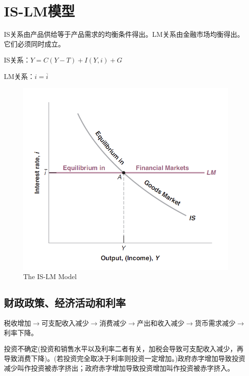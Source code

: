 \documentclass{article}
\begin{document}
\section{IS-LM模型}

IS关系由产品供给等于产品需求的均衡条件得出。LM关系由金融市场均衡得出。它们必须同时成立。

IS关系：$ Y=C(Y-T)+I(Y,i)+G $

LM关系：$ i=\overline{i} $

\begin{figure}[H] %
	\centering %
	\includegraphics[width=1\textwidth]{5_4} %
	\caption{The IS-LM Model} %
	\label{Fig.main5} %
\end{figure}







\iffalse
\subsection{财政政策、经济活动和利率}
税收增加$ \rightarrow $可支配收入减少$ \rightarrow $消费减少$ \rightarrow $产出和收入减少$ \rightarrow $货币需求减少$ \rightarrow $利率下降。

投资不确定(投资和销售水平以及利率二者有关，加税会导致可支配收入减少，再导致消费下降)。(若投资完全取决于利率则投资一定增加。)政府赤字增加导致投资减少叫作投资被赤字挤出；政府赤字增加导致投资增加叫作投资被赤字挤入。
\end{document}
